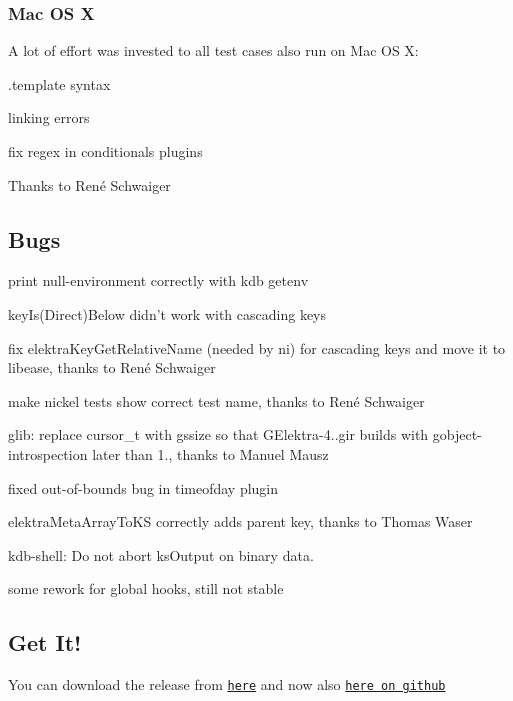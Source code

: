 \subsubsection*{Mac O\+S X}

A lot of effort was invested to all test cases also run on Mac O\+S X\+:


\begin{DoxyItemize}
\item .template syntax
\item linking errors
\item fix regex in conditionals plugins
\end{DoxyItemize}

Thanks to René Schwaiger

\subsection*{Bugs}


\begin{DoxyItemize}
\item print null-\/environment correctly with {\ttfamily kdb getenv}
\item key\+Is(\+Direct)Below didn't work with cascading keys
\item fix elektra\+Key\+Get\+Relative\+Name (needed by ni) for cascading keys and move it to libease, thanks to René Schwaiger
\item make nickel tests show correct test name, thanks to René Schwaiger
\item glib\+: replace cursor\+\_\+t with gssize so that G\+Elektra-\/4..\+gir builds with gobject-\/introspection later than 1., thanks to Manuel Mausz
\item fixed out-\/of-\/bounds bug in timeofday plugin
\item elektra\+Meta\+Array\+To\+K\+S correctly adds parent key, thanks to Thomas Waser
\item kdb-\/shell\+: Do not abort ks\+Output on binary data.
\item some rework for global hooks, still not stable
\end{DoxyItemize}

\subsection*{Get It!}

You can download the release from \href{http://www.libelektra.org/ftp/elektra/releases/elektra-0.8.16.tar.gz}{\tt here} and now also \href{https://github.com/ElektraInitiative/ftp/tree/master/releases/elektra-0.8.16.tar.gz}{\tt here on github}


